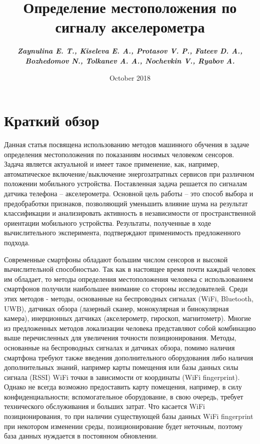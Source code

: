 \documentclass{article}
\title{Определение местоположения по сигналу акселерометра}
\author{\bf \em Zaynulina E. T., Kiseleva E. A., Protasov V. P., Fateev D. A.,\\
 \bf \em Bozhedomov N., Tolkanev A. A., Nochevkin V., Ryabov A. }
\date{October 2018}
\begin{document}
\maketitle

\section{Краткий обзор}
Данная статья посвящена использованию методов машинного обучения в задаче определения
местоположения по показаниям носимых человеком сенсоров. Задача является актуальной и имеет такое применение, как,
например, автоматическое включение/выключение энергозатратных сервисов при различном
положении мобильного устройства. Поставленная задача решается по сигналам датчика телефона – акселерометра. Основной цель работы – это способ
выбора и предобработки признаков, позволяющий уменьшить влияние шума на результат
классификации и анализировать активность в независимости от пространственной
ориентации мобильного устройства. Результаты, полученные в ходе вычислительного эксперимента,
подтверждают применимость предложенного подхода.

\bigskip

Современные смартфоны обладают большим числом сенсоров и высокой вычислительной способностью. Так как в настоящее время почти каждый человек им обладает, то методы определения местоположения человека с использованием смартфонов получили наибольшее внимание со стороны исследователей. Среди этих методов - методы, основанные на беспроводных сигналах (WiFi, Bluetooth, UWB)\cite{journals/puc/VeraOA11}\cite{journals/puc/KimJP13}, датчиках обзора (лазерный сканер, монокулярная и бинокулярная камера)\cite{journals/puc/BrunsB09}, инерционных датчиках (акселерометр, гироскоп, магнитометр)\cite{journals/puc/ParkSC13}\cite{journals/puc/HardeggerRT15}\cite{journals/sensors/WangLYJG18}\cite{6987239}. Многие из предложенных методов локализации человека представляют собой комбинацию выше перечисленных для увеличения точности позиционирования\cite{journals/ejasp/EvennouM06}\cite{6834746}\cite{7021969}. Методы, основанные на беспроводных сигналах и датчиках обзора, помимо наличия смартфона требуют также введения дополнительного оборудования либо наличия дополнительных знаний, например карты помещения или базы данных силы сигнала (RSSI) WiFi точки в зависимости от координаты (WiFi fingerprint). Однако не всегда возможно предоставить карту помещения, например, в силу конфиденциальности; вспомогательное оборудование, в свою очередь, требует технического обслуживания и больших затрат. Что касается WiFi позиционирования, то при наличии существующей базы данных WiFi fingerprint при некотором изменении среды, позиционирование будет неточным, поэтому база данных нуждается в постоянном обновлении\cite{journals/sensors/Torres-Sospedra17a}.
\end{document}
